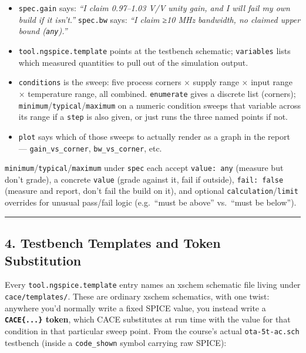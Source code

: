 \documentclass[
]{article}
\providecommand{\tightlist}{%
  \setlength{\itemsep}{0pt}\setlength{\parskip}{0pt}}
\begin{document}
\begin{itemize}
\tightlist
\item
  \texttt{spec.gain} says: \emph{``I claim 0.97--1.03 V/V unity gain,
  and I will fail my own build if it isn't.''} \texttt{spec.bw} says:
  \emph{``I claim ≥10 MHz bandwidth, no claimed upper bound
  (\texttt{any}).''}
\item
  \texttt{tool.ngspice.template} points at the testbench schematic;
  \texttt{variables} lists which measured quantities to pull out of the
  simulation output.
\item
  \texttt{conditions} is the sweep: five process corners × supply range
  × input range × temperature range, all combined. \texttt{enumerate}
  gives a discrete list (corners);
  \texttt{minimum}/\texttt{typical}/\texttt{maximum} on a numeric
  condition sweeps that variable across its range if a \texttt{step} is
  also given, or just runs the three named points if not.
\item
  \texttt{plot} says which of those sweeps to actually render as a graph
  in the report --- \texttt{gain\_vs\_corner}, \texttt{bw\_vs\_corner},
  etc.
\end{itemize}

\texttt{minimum}/\texttt{typical}/\texttt{maximum} under \texttt{spec}
each accept \texttt{value:\ any} (measure but don't grade), a concrete
\texttt{value} (grade against it, fail if outside),
\texttt{fail:\ false} (measure and report, don't fail the build on it),
and optional \texttt{calculation}/\texttt{limit} overrides for unusual
pass/fail logic (e.g.~``must be above'' vs.~``must be below'').

\begin{center}\rule{0.5\linewidth}{0.5pt}\end{center}

\hypertarget{testbench-templates-and-token-substitution}{%
\subsection{4. Testbench Templates and Token
Substitution}\label{testbench-templates-and-token-substitution}}

Every \texttt{tool.ngspice.template} entry names an xschem schematic
file living under \texttt{cace/templates/}. These are ordinary xschem
schematics, with one twist: anywhere you'd normally write a fixed SPICE
value, you instead write a \textbf{\texttt{CACE\{...\}} token}, which
CACE substitutes at run time with the value for that condition in that
particular sweep point. From the course's actual \texttt{ota-5t-ac.sch}
testbench (inside a \texttt{code\_shown} symbol carrying raw SPICE):
\end{document}
